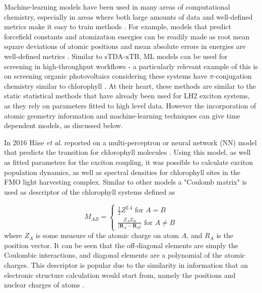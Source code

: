 Machine-learning models have been used in many areas of computational chemistry,
especially in areas where both large amounts of data and well-defined metrics make 
it easy to train  methods \cite{Dral2020, Behler2011, Westermayr2020, Schutt2019, Sajjan2022}.
For example, models that predict forcefield constants and atomization energies can
be readily made as root mean square deviations of atomic positions and mean absolute 
errors in energies are well-defined metrics  \cite{Rupp2012, Dick2019, Scherer2020}.
Similar to sTDA-xTB, ML models can be used for screening in high-throughput workflows 
- a particularly relevant example of this is on screening organic photovoltaics 
considering these systems have $\pi$-conjugation chemistry similar to chlorophyll \cite{Zhao2022}.
At their heart, these methods are similar to the static statistical methods that
have already been used for LH2 exciton systems, as they rely on parameters fitted to
high level data. However the incorporation of atomic geometry information and machine-learning
techniques can give time dependent models, as discussed below.

In 2016 H\"{a}se \emph{et al.} reported on a multi-perceptron or neural network (NN)
model that predicts the \Qy transition for chlorophyll molecules \cite{AspuruGuzik2016}.
Using this model, as well as fitted parameters for the exciton coupling, it was 
possible to calculate exciton population dynamics, as well as spectral densities
for chlorophyll sites in the FMO light harvesting complex. Similar to other models
a "Coulomb matrix" \cite{Rupp2012a, Montavon2013} is used as descriptor of the chlorophyll
systems defined as 

\begin{equation}
	M_{AB} = 
	  \begin{cases}
		\frac{1}{2} Z^{2.4} \text{ for } A = B\\
		\frac{Z_A Z_B}{\left\lvert \mathbf{R}_A - \mathbf{R}_B\right\rvert} \text{ for } A \neq B
	  \end{cases}
\end{equation}
%
where $Z_A$ is some measure of the atomic charge on atom $A$, and $R_A$ is the position
vector. It can be seen that the off-diagonal elements are simply the Coulombic interactions,
and diagonal elements are a polynomial of the atomic charges. This descriptor is
popular due to the similarity in information that an electronic structure calculation
would start from, namely the positions and nuclear charges of atoms \cite{Raghunathan2022}.

